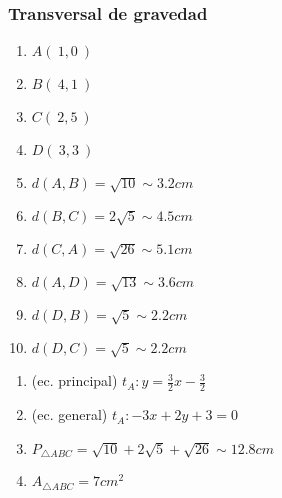 \documentclass[12pt,spanish,x11names]{beamer}
\title{\talktitle}
\subtitle{\talksubtitle}
\author{\talkauthor}
\institute{\talkaffiliation}
\date{\footnotesize{\emph{\href{\talkblog}{\talkemail}}}}
\begin{document}
\begin{frame}
\titlepage
\end{frame}
\begin{frame}
  \frametitle{Transversal de gravedad}
  \begin{minipage}[t]{.5\linewidth}
    \begin{enumerate}
    \item $A(\ 1,0 \ )$
    \item $B(\ 4,1 \ )$
    \item $C(\ 2,5 \ )$
    \item $D(\ 3,3 \ )$
    \item $d(A,B)=\sqrt{10}\sim 3.2cm$
    \item $d(B,C)=2\sqrt{5}\sim 4.5cm$
    \item $d(C,A)=\sqrt{26}\sim 5.1cm$
    \item $d(A,D)=\sqrt{13}\sim 3.6cm$
    \item $d(D,B)=\sqrt{5}\sim 2.2cm$
    \item $d(D,C)=\sqrt{5}\sim 2.2cm$
    \end{enumerate}
  \end{minipage}
  \begin{minipage}[t]{.45\linewidth}
    \begin{enumerate}
    \item (ec. principal) $t_A:y=\frac{3}{2}x-\frac{3}{2}$
    \item (ec. general) $t_A:-3x+2y+3=0$
    \item $P_{\triangle ABC}=\sqrt{10}+2\sqrt{5}+\sqrt{26}\sim 12.8 cm$
    \item $A_{\triangle ABC}=7cm^2$
    \end{enumerate}
  \end{minipage}
\end{frame}
\end{document}
